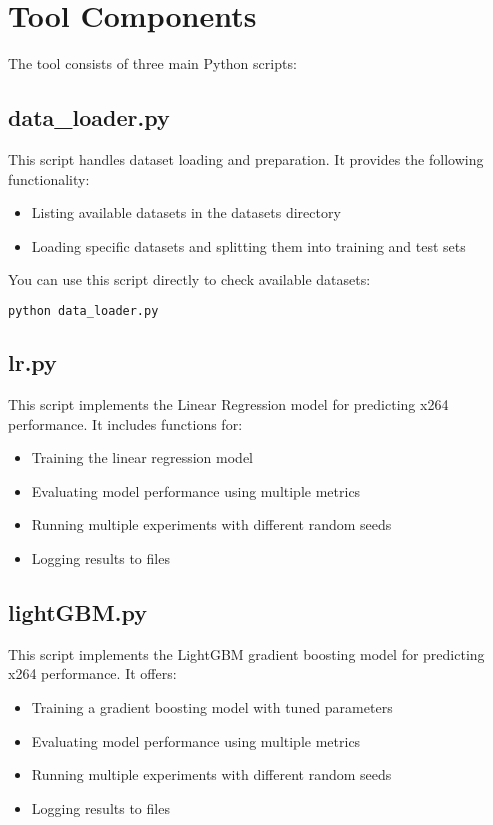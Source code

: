 \documentclass[10pt]{article}
\begin{document}
\section{Tool Components}

The tool consists of three main Python scripts:

\subsection{data\_loader.py}
This script handles dataset loading and preparation. It provides the following functionality:
\begin{itemize}
    \item Listing available datasets in the datasets directory
    \item Loading specific datasets and splitting them into training and test sets
\end{itemize}

You can use this script directly to check available datasets:
\begin{lstlisting}[language=bash]
python data_loader.py
\end{lstlisting}

\subsection{lr.py}
This script implements the Linear Regression model for predicting x264 performance. It includes functions for:
\begin{itemize}
    \item Training the linear regression model
    \item Evaluating model performance using multiple metrics
    \item Running multiple experiments with different random seeds
    \item Logging results to files
\end{itemize}

\subsection{lightGBM.py}
This script implements the LightGBM gradient boosting model for predicting x264 performance. It offers:
\begin{itemize}
    \item Training a gradient boosting model with tuned parameters
    \item Evaluating model performance using multiple metrics
    \item Running multiple experiments with different random seeds
    \item Logging results to files
\end{itemize}
\end{document}
